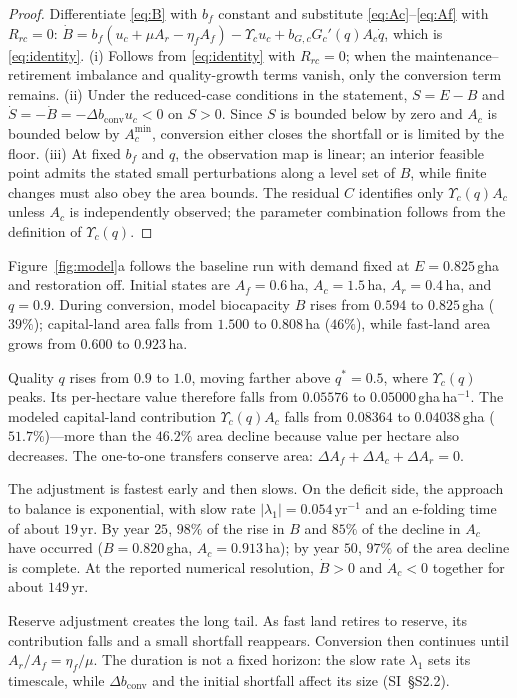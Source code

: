 \documentclass[preprint,12pt,authoryear]{elsarticle}
\newcommand{\dconv}{\Delta b_{\mathrm{conv}}}
\newcommand{\Ups}{\Upsilon_c}
\newcommand{\Acmin}{A_c^{\min}}
\begin{document}
\begin{proof}
Differentiate \eqref{eq:B} with $b_f$ constant and substitute \eqref{eq:Ac}--\eqref{eq:Af} with $R_{rc}=0$: $\dot B=b_f(u_c+\mu A_r-\eta_fA_f)-\Ups u_c+b_{G,c}G_c'(q)A_c\dot q$, which is \eqref{eq:identity}. (i) Follows from \eqref{eq:identity} with $R_{rc}=0$; when the maintenance--retirement imbalance and quality-growth terms vanish, only the conversion term remains. (ii) Under the reduced-case conditions in the statement, $S=E-B$ and $\dot S=-\dot B=-\dconv u_c<0$ on $S>0$. Since $S$ is bounded below by zero and $A_c$ is bounded below by $\Acmin$, conversion either closes the shortfall or is limited by the floor. (iii) At fixed $b_f$ and $q$, the observation map is linear; an interior feasible point admits the stated small perturbations along a level set of $B$, while finite changes must also obey the area bounds. The residual $C$ identifies only $\Ups(q)A_c$ unless $A_c$ is independently observed; the parameter combination follows from the definition of $\Ups(q)$.
\end{proof}

Figure~\ref{fig:model}a follows the baseline run with demand fixed at $E=0.825$\,gha and restoration off. Initial states are $A_f=0.6$\,ha, $A_c=1.5$\,ha, $A_r=0.4$\,ha, and $q=0.9$. During conversion, model biocapacity $B$ rises from $0.594$ to $0.825$\,gha ($39\%$); capital-land area falls from $1.500$ to $0.808$\,ha ($46\%$), while fast-land area grows from $0.600$ to $0.923$\,ha.

Quality $q$ rises from $0.9$ to $1.0$, moving farther above $q^*=0.5$, where $\Ups(q)$ peaks. Its per-hectare value therefore falls from $0.05576$ to $0.05000$\,gha\,ha$^{-1}$. The modeled capital-land contribution $\Ups(q)A_c$ falls from $0.08364$ to $0.04038$\,gha ($51.7\%$)—more than the $46.2\%$ area decline because value per hectare also decreases. The one-to-one transfers conserve area: $\Delta A_f+\Delta A_c+\Delta A_r=0$.

The adjustment is fastest early and then slows. On the deficit side, the approach to balance is exponential, with slow rate $|\lambda_1|=0.054$\,yr$^{-1}$ and an e-folding time of about $19$\,yr. By year $25$, $98\%$ of the rise in $B$ and $85\%$ of the decline in $A_c$ have occurred ($B=0.820$\,gha, $A_c=0.913$\,ha); by year $50$, $97\%$ of the area decline is complete. At the reported numerical resolution, $\dot B>0$ and $\dot A_c<0$ together for about $149$\,yr.

Reserve adjustment creates the long tail. As fast land retires to reserve, its contribution falls and a small shortfall reappears. Conversion then continues until $A_r/A_f=\eta_f/\mu$. The duration is not a fixed horizon: the slow rate $\lambda_1$ sets its timescale, while $\dconv$ and the initial shortfall affect its size (SI~\S S2.2).
\end{document}
